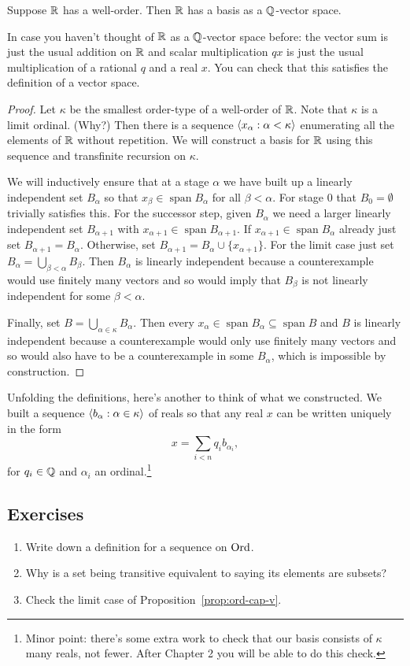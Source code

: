 \documentclass[10pt]{amsart}
\DeclareMathOperator{\vspan}{span}
\begin{document}
\begin{theorem}
Suppose $\mathbb{R}$ has a well-order. Then $\mathbb{R}$ has a basis as a $\mathbb{Q}$-vector space.
\end{theorem}

In case you haven't thought of $\mathbb{R}$ as a $\mathbb{Q}$-vector space before: the vector sum is just the usual addition on $\mathbb{R}$ and scalar multiplication $q x$ is just the usual multiplication of a rational $q$ and a real $x$. You can check that this satisfies the definition of a vector space.

\begin{proof}
Let $\kappa$ be the smallest order-type of a well-order of $\mathbb{R}$. Note that $\kappa$ is a limit ordinal. (Why?) Then there is a sequence ${\left\langle x_\alpha : \alpha < \kappa \right\rangle}$ enumerating all the elements of $\mathbb{R}$ without repetition. We will construct a basis for $\mathbb{R}$ using this sequence and transfinite recursion on $\kappa$.

We will inductively ensure that at a stage $\alpha$ we have built up a linearly independent set $B_\alpha$ so that $x_\beta \in \vspan B_\alpha$ for all $\beta < \alpha$. For stage $0$ that $B_0 = \emptyset$ trivially satisfies this. For the successor step, given $B_\alpha$ we need a larger linearly independent set $B_{\alpha +1}$ with $x_{\alpha+1} \in \vspan B_{\alpha+1}$. If $x_{\alpha+1} \in \vspan B_\alpha$ already just set $B_{\alpha + 1} = B_\alpha$. Otherwise, set $B_{\alpha+1} = B_\alpha \cup \{x_{\alpha+1}\}$. For the limit case just set $B_\alpha = \bigcup_{\beta < \alpha} B_\beta$. Then $B_\alpha$ is linearly independent because a counterexample would use finitely many vectors and so would imply that $B_\beta$ is not linearly independent for some $\beta < \alpha$.

Finally, set $B = \bigcup_{\alpha \in \kappa} B_\alpha$. Then every $x_\alpha \in \vspan B_\alpha \subseteq \vspan B$ and $B$ is linearly independent because a counterexample would only use finitely many vectors and so would also have to be a counterexample in some $B_\alpha$, which is impossible by construction.
\end{proof}

Unfolding the definitions, here's another to think of what we constructed. We built a sequence ${\left\langle b_\alpha : \alpha \in \kappa \right\rangle}$ of reals so that any real $x$ can be written uniquely in the form
\[
x = \sum_{i < n} q_i b_{\alpha_i},
\]
for $q_i \in \mathbb{Q}$ and $\alpha_i$ an ordinal.\footnote{Minor point: there's some extra work to check that our basis consists of $\kappa$ many reals, not fewer. After Chapter 2 you will be able to do this check.}


\subsection*{Exercises}

\begin{enumerate}
\item Write down a definition for a sequence on $\mathrm{Ord}$.
\item Why is a set being transitive equivalent to saying its elements are subsets?
\item Check the limit case of Proposition~\ref{prop:ord-cap-v}.
\end{enumerate}
\end{document}
